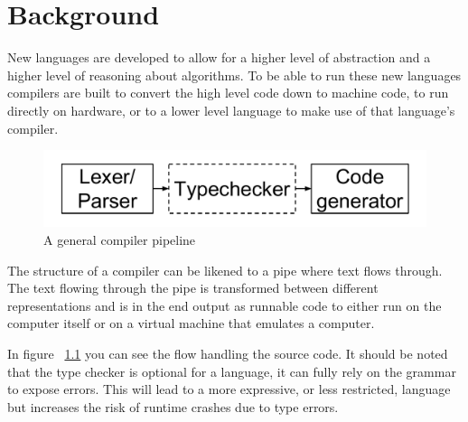 \chapter{Background}




New languages are developed to allow for a higher level of abstraction and a higher
level of reasoning about algorithms. To be able to run these new languages
compilers are built to convert the high level code down to machine code, to run 
directly on hardware, or to a lower level language to make use of that language's compiler. 



\begin{figure}[h!]
  \centering
  \includegraphics[width=0.6\pdfpagewidth]{figure/general-pipeline}
  \caption{A general compiler pipeline}
  \label{fig:generalpipeline}
\end{figure}


The structure of a compiler can be likened to a pipe where text flows through. 
The text flowing through the pipe is transformed between different representations and is in
the end output as runnable code to either run on the computer itself or on a virtual machine
that emulates a computer. 

In figure ~\ref{fig:generalpipeline} you can see the flow handling the source code.
It should be noted that the type checker is optional for a language, it can
fully rely on the grammar to expose errors. This will lead to a more expressive, 
or less restricted, language but increases the risk of runtime crashes due to type errors.












